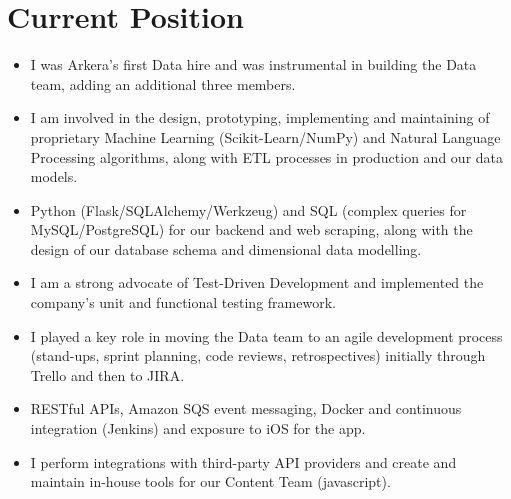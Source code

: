 \documentclass[11pt,a4paper,sans]{moderncv}        %
\begin{document}
\section{Current Position}
\vspace*{-0.15cm}
{
\begin{itemize}%
\item I was Arkera's first Data hire and was instrumental in building the Data team, adding an additional three members.
\item I am involved in the design, prototyping, implementing and maintaining of proprietary Machine Learning (Scikit-Learn/NumPy) and Natural Language Processing algorithms, along with ETL processes in production and our data models.
\item Python (Flask/SQLAlchemy/Werkzeug) and SQL (complex queries for MySQL/PostgreSQL) for our backend and web scraping, along with the design of our database schema and dimensional data modelling.
\item I am a strong advocate of Test-Driven Development and implemented the company's unit and functional testing framework. 
\item I played a key role in moving the Data team to an agile development process (stand-ups, sprint planning, code reviews, retrospectives) initially through Trello and then to JIRA.
\item RESTful APIs, Amazon SQS event messaging, Docker and continuous integration (Jenkins) and exposure to iOS for the app.
\item I perform integrations with third-party API providers and create and maintain in-house tools for our Content Team (javascript).
\end{itemize}}
\vspace*{-0.5cm}
\end{document}
